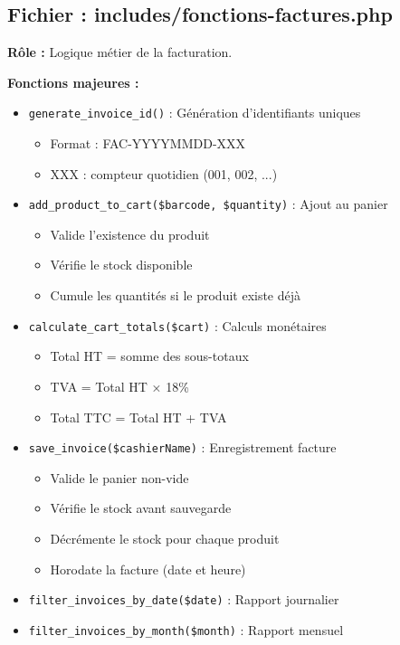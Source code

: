 \documentclass[12pt,a4paper]{report}
\begin{document}
\subsection{Fichier : includes/fonctions-factures.php}

\textbf{Rôle :} Logique métier de la facturation.

\textbf{Fonctions majeures :}

\begin{itemize}
    \item \texttt{generate\_invoice\_id()} : Génération d'identifiants uniques
        \begin{itemize}
            \item Format : FAC-YYYYMMDD-XXX
            \item XXX : compteur quotidien (001, 002, ...)
        \end{itemize}
    
    \item \texttt{add\_product\_to\_cart(\$barcode, \$quantity)} : Ajout au panier
        \begin{itemize}
            \item Valide l'existence du produit
            \item Vérifie le stock disponible
            \item Cumule les quantités si le produit existe déjà
        \end{itemize}
    
    \item \texttt{calculate\_cart\_totals(\$cart)} : Calculs monétaires
        \begin{itemize}
            \item Total HT = somme des sous-totaux
            \item TVA = Total HT × 18\%
            \item Total TTC = Total HT + TVA
        \end{itemize}
    
    \item \texttt{save\_invoice(\$cashierName)} : Enregistrement facture
        \begin{itemize}
            \item Valide le panier non-vide
            \item Vérifie le stock avant sauvegarde
            \item Décrémente le stock pour chaque produit
            \item Horodate la facture (date et heure)
        \end{itemize}
    
    \item \texttt{filter\_invoices\_by\_date(\$date)} : Rapport journalier
    \item \texttt{filter\_invoices\_by\_month(\$month)} : Rapport mensuel
\end{itemize}
\end{document}
